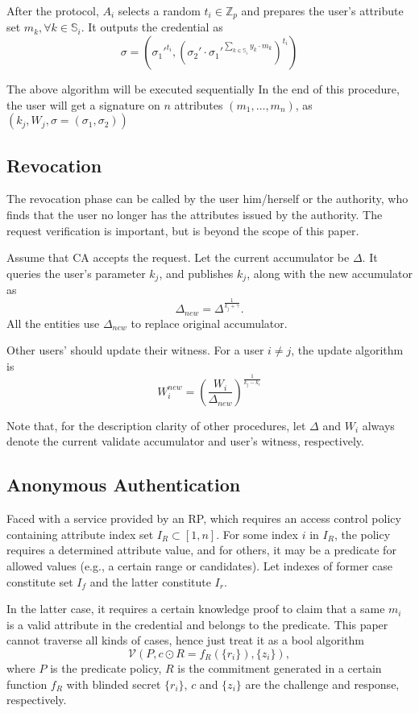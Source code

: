 \documentclass[journal]{IEEEtran}
\begin{document}
After the protocol, $A_i$ selects a random $t_i\in\mathbb{Z}_p$ and prepares the user's attribute set $m_k, \forall k\in \mathbb{S}_i$. It outputs the credential as 
$$\sigma = (\sigma_1'^{t_i}, (\sigma_2'\cdot \sigma_1'^{\sum_{k\in\mathbb{S}_i }y_k \cdot m_k})^{t_i})$$

The above algorithm will be executed sequentially In the end of this procedure, the user will get a signature on $n$ attributes $(m_1,\dots, m_n)$, as $(k_j, W_j, \sigma=(\sigma_1, \sigma_2))$

\subsection{Revocation}
The revocation phase can be called by the user him/herself or the authority, who finds that the user no longer has the attributes issued by the authority. The request verification is important, but is beyond the scope of this paper. 

Assume that CA accepts the request. Let the current accumulator be $\Delta$. It queries the user's parameter $k_j$, and publishes $k_j$, along with the new accumulator as $$\Delta_{new} = \Delta^{\frac{1}{k_j + \gamma}}.$$ All the entities use $\Delta_{new}$ to replace original accumulator. 

Other users' should update their witness. For a user $i\neq j$, the update algorithm is 
$$W_i^{new} = (\frac{W_i}{\Delta_{new}})^{\frac{1}{k_j-k_i}}$$

Note that, for the description clarity of other procedures, let $\Delta$ and $W_i$ always denote the current validate accumulator and user's witness, respectively. 
	
	
\subsection{Anonymous Authentication}
Faced with a service provided by an RP, which requires an access control policy containing attribute index set $I_R\subset [1, n]$. For some index $i$ in $I_R$, the policy requires a determined attribute value, and for others, it may be a predicate for allowed values (e.g., a certain range or candidates).  Let indexes of former case constitute set $I_f$ and the latter constitute $I_r$. 

In the latter case, it requires a certain knowledge proof to claim that a same $m_i$ is a valid attribute in the credential and belongs to the predicate. This paper cannot traverse all kinds of cases, hence just treat it as a bool algorithm 
$$\mathcal{V}(P, c\odot R=f_R(\{r_i\}), \{z_i\}),$$
where $P$ is the predicate policy, $R$ is the commitment generated in a certain function $f_R$ with blinded secret $\{r_i\}$, $c$ and $\{z_i\}$ are the challenge and response, respectively.
\end{document}
